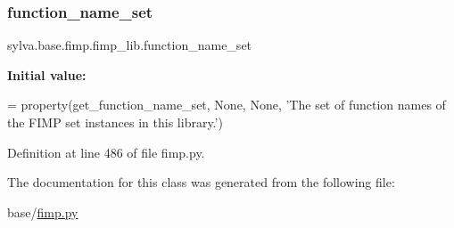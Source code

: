 \subsubsection{\texorpdfstring{function\+\_\+name\+\_\+set}{function\_name\_set}}
{\footnotesize\ttfamily sylva.\+base.\+fimp.\+fimp\+\_\+lib.\+function\+\_\+name\+\_\+set\hspace{0.3cm}{\ttfamily [static]}}

{\bfseries Initial value\+:}
\begin{DoxyCode}
=  property(get\_function\_name\_set, \textcolor{keywordtype}{None}, \textcolor{keywordtype}{None},
      \textcolor{stringliteral}{'The set of function names of the FIMP set instances in this library.'})
\end{DoxyCode}


Definition at line 486 of file fimp.\+py.



The documentation for this class was generated from the following file\+:\begin{DoxyCompactItemize}
\item 
base/\hyperlink{fimp_8py}{fimp.\+py}\end{DoxyCompactItemize}
